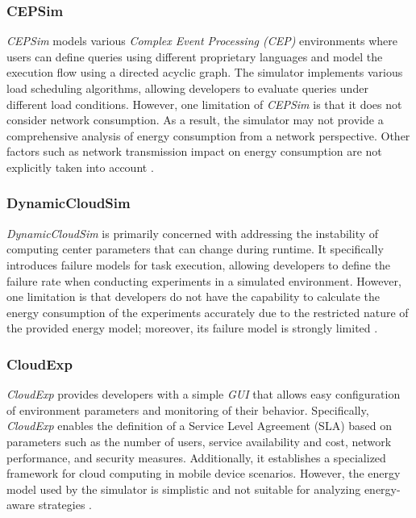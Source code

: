 {\subsubsection*{CEPSim}
\emph{CEPSim} \cite{higashino2015cepsim} models various \emph{Complex Event Processing (CEP)} environments \cite{luckham1998complex} where users can define queries using different proprietary languages and model the execution flow using a directed acyclic graph. The simulator implements various load scheduling algorithms, allowing developers to evaluate queries under different load conditions. However, one limitation of \emph{CEPSim} is that it does not consider network consumption. As a result, the simulator may not provide a comprehensive analysis of energy consumption from a network perspective. Other factors such as network transmission impact on energy consumption are not explicitly taken into account \cite{mansouri2020cloud}.
\subsubsection*{DynamicCloudSim}
\emph{DynamicCloudSim} \cite{bux2013dynamiccloudsim} is primarily concerned with addressing the instability of computing center parameters that can change during runtime. It specifically introduces failure models for task execution, allowing developers to define the failure rate when conducting experiments in a simulated environment. However, one limitation is that developers do not have the capability to calculate the energy consumption of the experiments accurately due to the restricted nature of the provided energy model; moreover, its failure model is strongly limited \cite{mansouri2020cloud} \cite{suryateja2016comparative}.
\subsubsection*{CloudExp}
\emph{CloudExp} \cite{jararweh2014cloudexp} provides developers with a simple \emph{GUI} that allows easy configuration of environment parameters and monitoring of their behavior. Specifically, \emph{CloudExp} enables the definition of a Service Level Agreement (SLA) based on parameters such as the number of users, service availability and cost, network performance, and security measures. Additionally, it establishes a specialized framework for cloud computing in mobile device scenarios. However, the energy model used by the simulator is simplistic and not suitable for analyzing energy-aware strategies \cite{mansouri2020cloud} \cite{khalil2017cloud}.
}
